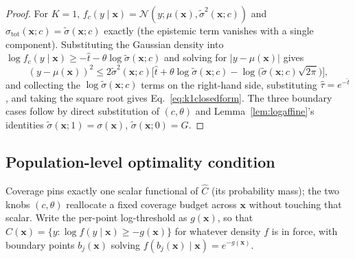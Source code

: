 \documentclass[10pt,twocolumn,a4paper]{article}
\begin{document}
\begin{proof}
For $K=1$, $f_c(y\mid\bm x)=\mathcal N(y;\mu(\bm x),\tilde\sigma^2(\bm x;c))$ and
$\sigma_{\mathrm{tot}}(\bm x;c)=\tilde\sigma(\bm x;c)$ exactly (the epistemic term vanishes with a
single component). Substituting the Gaussian density into $\log f_c(y\mid\bm x)\ge-\hat t-\theta\log\tilde\sigma(\bm x;c)$
and solving for $|y-\mu(\bm x)|$ gives
\[
(y-\mu(\bm x))^2 \le 2\tilde\sigma^2(\bm x;c)\Big[\hat t+\theta\log\tilde\sigma(\bm x;c)-\log\big(\tilde\sigma(\bm x;c)\sqrt{2\pi}\big)\Big],
\]
and collecting the $\log\tilde\sigma(\bm x;c)$ terms on the right-hand side, substituting
$\hat\tau=e^{-\hat t}$, and taking the square root gives Eq.~\eqref{eq:k1closedform}. The three
boundary cases follow by direct substitution of $(c,\theta)$ and Lemma~\ref{lem:logaffine}'s
identities $\tilde\sigma(\bm x;1)=\sigma(\bm x)$, $\tilde\sigma(\bm x;0)=G$.
\end{proof}

\subsection{Population-level optimality condition}
Coverage pins exactly one scalar functional of $\hat C$ (its probability mass); the two knobs
$(c,\theta)$ reallocate a fixed coverage budget across $\bm x$ without touching that scalar. Write
the per-point log-threshold as $g(\bm x)$, so that $\hat C(\bm x) = \{y: \log f(y\mid\bm x)\ge -g(\bm x)\}$
for whatever density $f$ is in force, with boundary points $b_j(\bm x)$ solving
$f(b_j(\bm x)\mid\bm x) = e^{-g(\bm x)}$.
\end{document}
